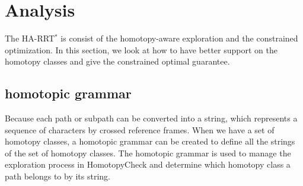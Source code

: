 \documentclass[letterpaper, 10 pt, conference]{ieeeconf}
\begin{document}
\section{Analysis}
\label{sec:analysis}

The HA-RRT$^{*}$ is consist of the homotopy-aware exploration and the constrained optimization.
In this section, we look at how to have better support on the homotopy classes and give the constrained optimal guarantee.

\subsection{homotopic grammar}

Because each path or subpath can be converted into a string, which represents a sequence of characters by crossed reference frames.
When we have a set of homotopy classes, a homotopic grammar can be created to define all the strings of the set of homotopy classes.
The homotopic grammar is used to manage the exploration process in {\sc HomotopyCheck} and determine which homotopy class a path belongs to by its string.
\end{document}
